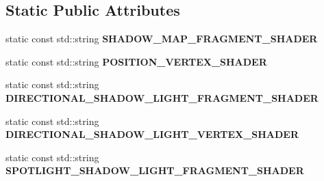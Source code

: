 \subsection*{Static Public Attributes}
\begin{DoxyCompactItemize}
\item 
\mbox{\label{struct_geometry_engine_1_1_geometry_world_item_1_1_geometry_light_1_1_shadow_map_constants_a71f0f99aa2828df5040f38ae6e703099}} 
static const std\+::string {\bfseries S\+H\+A\+D\+O\+W\+\_\+\+M\+A\+P\+\_\+\+F\+R\+A\+G\+M\+E\+N\+T\+\_\+\+S\+H\+A\+D\+ER}
\item 
\mbox{\label{struct_geometry_engine_1_1_geometry_world_item_1_1_geometry_light_1_1_shadow_map_constants_a6497a960ea287836f98475668b9405b3}} 
static const std\+::string {\bfseries P\+O\+S\+I\+T\+I\+O\+N\+\_\+\+V\+E\+R\+T\+E\+X\+\_\+\+S\+H\+A\+D\+ER}
\item 
\mbox{\label{struct_geometry_engine_1_1_geometry_world_item_1_1_geometry_light_1_1_shadow_map_constants_a08ac0f58c281c34b95ea1d6b86408ea0}} 
static const std\+::string {\bfseries D\+I\+R\+E\+C\+T\+I\+O\+N\+A\+L\+\_\+\+S\+H\+A\+D\+O\+W\+\_\+\+L\+I\+G\+H\+T\+\_\+\+F\+R\+A\+G\+M\+E\+N\+T\+\_\+\+S\+H\+A\+D\+ER}
\item 
\mbox{\label{struct_geometry_engine_1_1_geometry_world_item_1_1_geometry_light_1_1_shadow_map_constants_a518d641248f3a14481c19684def552a6}} 
static const std\+::string {\bfseries D\+I\+R\+E\+C\+T\+I\+O\+N\+A\+L\+\_\+\+S\+H\+A\+D\+O\+W\+\_\+\+L\+I\+G\+H\+T\+\_\+\+V\+E\+R\+T\+E\+X\+\_\+\+S\+H\+A\+D\+ER}
\item 
\mbox{\label{struct_geometry_engine_1_1_geometry_world_item_1_1_geometry_light_1_1_shadow_map_constants_a1ede9618d7b64cbd9c01d273acd1c7c3}} 
static const std\+::string {\bfseries S\+P\+O\+T\+L\+I\+G\+H\+T\+\_\+\+S\+H\+A\+D\+O\+W\+\_\+\+L\+I\+G\+H\+T\+\_\+\+F\+R\+A\+G\+M\+E\+N\+T\+\_\+\+S\+H\+A\+D\+ER}

\end{DoxyCompactItemize}
